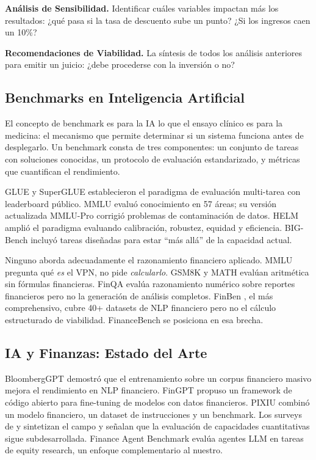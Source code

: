 \documentclass[12pt,a4paper]{article}
\begin{document}
\textbf{Análisis de Sensibilidad.} Identificar cuáles variables impactan más los resultados: ¿qué pasa si la tasa de descuento sube un punto? ¿Si los ingresos caen un 10\%?

\textbf{Recomendaciones de Viabilidad.} La síntesis de todos los análisis anteriores para emitir un juicio: ¿debe procederse con la inversión o no?

\subsection{Benchmarks en Inteligencia Artificial}

El concepto de benchmark es para la IA lo que el ensayo clínico es para la medicina: el mecanismo que permite determinar si un sistema funciona antes de desplegarlo. Un benchmark consta de tres componentes: un conjunto de tareas con soluciones conocidas, un protocolo de evaluación estandarizado, y métricas que cuantifican el rendimiento.

GLUE \citep{Wang2019} y SuperGLUE \citep{Wang2019b} establecieron el paradigma de evaluación multi-tarea con leaderboard público. MMLU \citep{Hendrycks2021} evaluó conocimiento en 57 áreas; su versión actualizada MMLU-Pro \citep{Yuan2024} corrigió problemas de contaminación de datos. HELM \citep{Liang2023} amplió el paradigma evaluando calibración, robustez, equidad y eficiencia. BIG-Bench \citep{Srivastava2022} incluyó tareas diseñadas para estar ``más allá'' de la capacidad actual.

Ninguno aborda adecuadamente el razonamiento financiero aplicado. MMLU pregunta qué \textit{es} el VPN, no pide \textit{calcularlo}. GSM8K y MATH evalúan aritmética sin fórmulas financieras. FinQA \citep{Chen2021} evalúa razonamiento numérico sobre reportes financieros pero no la generación de análisis completos. FinBen \citep{Xie2024}, el más comprehensivo, cubre 40+ datasets de NLP financiero pero no el cálculo estructurado de viabilidad. FinanceBench se posiciona en esa brecha.

\subsection{IA y Finanzas: Estado del Arte}

BloombergGPT \citep{Wu2023} demostró que el entrenamiento sobre un corpus financiero masivo mejora el rendimiento en NLP financiero. FinGPT \citep{Yang2023} propuso un framework de código abierto para fine-tuning de modelos con datos financieros. PIXIU \citep{Xie2023} combinó un modelo financiero, un dataset de instrucciones y un benchmark. Los surveys de \citet{Li2023} y \citet{Nie2024} sintetizan el campo y señalan que la evaluación de capacidades cuantitativas sigue subdesarrollada. Finance Agent Benchmark \citep{Bigeard2025} evalúa agentes LLM en tareas de equity research, un enfoque complementario al nuestro.
\end{document}
